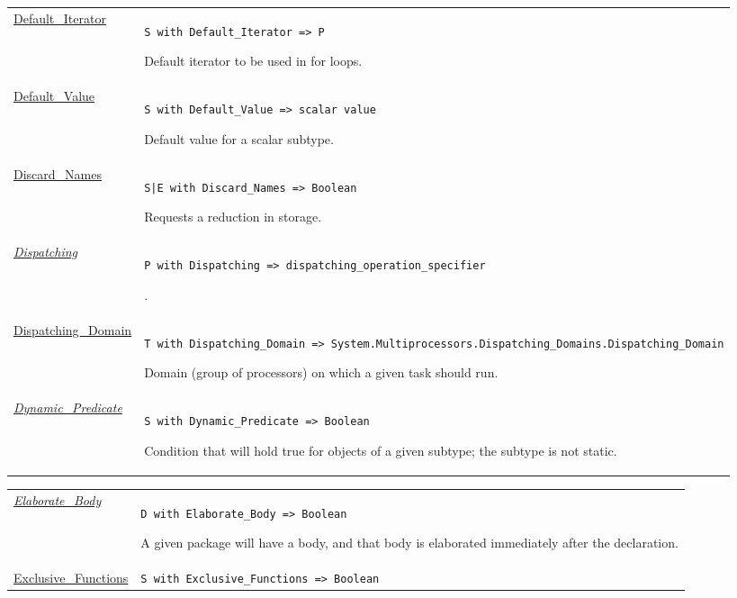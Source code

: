 \documentclass[english]{article}
\begin{document}
\begin{scriptsize}
\begin{multicols*}{3}
\begin{tabular}{@{}p{2cm}p{6.5cm}}
   \href{http://www.ada-auth.org/standards/22rm/html/RM-3-6.html}{Default\_Iterator} & \texttt{S with Default\_Iterator => P}

   Default iterator to be used in for loops.\\

   \href{http://www.ada-auth.org/standards/22rm/html/RM-3-5.html}{Default\_Value} & \texttt{S with Default\_Value => scalar value}

   Default value for a scalar subtype.\\

   \href{http://www.ada-auth.org/standards/22rm/html/RM-C-5.html}{Discard\_Names} & \texttt{S|E with Discard\_Names => Boolean}

   Requests a reduction in storage.\\

   \href{http://www.ada-auth.org/standards/22rm/html/RM-D-16-1.html}{\textit{Dispatching}} & \texttt{P with Dispatching => dispatching\_operation\_specifier}

  .\\

   \href{http://www.ada-auth.org/standards/22rm/html/RM-D-16-1.html}{Dispatching\_Domain} & \texttt{T with Dispatching\_Domain => System.\allowbreak Multiprocessors.\allowbreak Dispatching\_Domains.\allowbreak Dispatching\_Domain}

   Domain (group of processors) on which a given task should run.\\

   \href{http://www.ada-auth.org/standards/22rm/html/RM-3-2-4.html}{\textit{Dynamic\_Predicate}} & \texttt{S with Dynamic\_Predicate => Boolean}

   Condition that will hold true for objects of a given subtype; the subtype is not static.\\


\end{tabular}
\begin{tabular}{@{}p{2cm}p{6.5cm}}

   \href{http://www.ada-auth.org/standards/22rm/html/RM-10-2-1.html}{\textit{Elaborate\_Body}} & \texttt{D with Elaborate\_Body => Boolean}

   A given package will have a body, and that body is elaborated immediately after the declaration.\\

   \href{http://www.ada-auth.org/standards/22rm/html/RM-9-5-1.html}{Exclusive\_Functions} & \texttt{S with Exclusive\_Functions => Boolean}


\end{tabular}
\end{multicols*}
\end{scriptsize}
\end{document}

